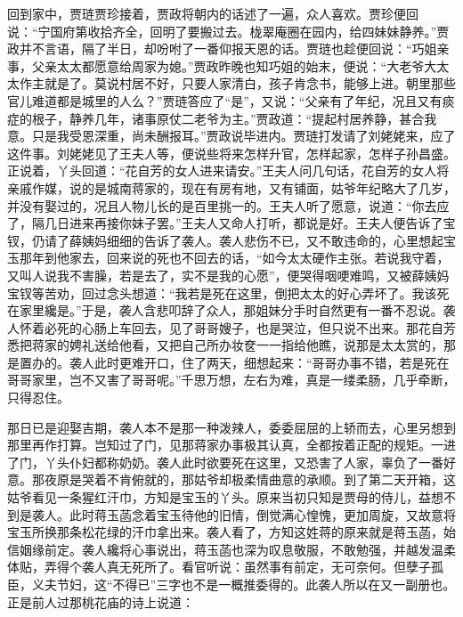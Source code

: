 \begin{parag}
    回到家中，贾琏贾珍接着，贾政将朝内的话述了一遍，众人喜欢。贾珍便回说：“宁国府第收拾齐全，回明了要搬过去。栊翠庵圈在园内，给四妹妹静养。”贾政并不言语，隔了半日，却吩咐了一番仰报天恩的话。贾琏也趁便回说：“巧姐亲事，父亲太太都愿意给周家为媳。”贾政昨晚也知巧姐的始末，便说：“大老爷大太太作主就是了。莫说村居不好，只要人家清白，孩子肯念书，能够上进。朝里那些官儿难道都是城里的人么？”贾琏答应了“是”，又说：“父亲有了年纪，况且又有痰症的根子，静养几年，诸事原仗二老爷为主。”贾政道：“提起村居养静，甚合我意。只是我受恩深重，尚未酬报耳。”贾政说毕进内。贾琏打发请了刘姥姥来，应了这件事。刘姥姥见了王夫人等，便说些将来怎样升官，怎样起家，怎样子孙昌盛。正说着，丫头回道：“花自芳的女人进来请安。”王夫人问几句话，花自芳的女人将亲戚作媒，说的是城南蒋家的，现在有房有地，又有铺面，姑爷年纪略大了几岁，并没有娶过的，况且人物儿长的是百里挑一的。王夫人听了愿意，说道：“你去应了，隔几日进来再接你妹子罢。”王夫人又命人打听，都说是好。王夫人便告诉了宝钗，仍请了薛姨妈细细的告诉了袭人。袭人悲伤不已，又不敢违命的，心里想起宝玉那年到他家去，回来说的死也不回去的话，“如今太太硬作主张。若说我守着，又叫人说我不害臊，若是去了，实不是我的心愿”，便哭得咽哽难鸣，又被薛姨妈宝钗等苦劝，回过念头想道：“我若是死在这里，倒把太太的好心弄坏了。我该死在家里纔是。”于是，袭人含悲叩辞了众人，那姐妹分手时自然更有一番不忍说。袭人怀着必死的心肠上车回去，见了哥哥嫂子，也是哭泣，但只说不出来。那花自芳悉把蒋家的娉礼送给他看，又把自己所办妆奁一一指给他瞧，说那是太太赏的，那是置办的。袭人此时更难开口，住了两天，细想起来：“哥哥办事不错，若是死在哥哥家里，岂不又害了哥哥呢。”千思万想，左右为难，真是一缕柔肠，几乎牵断，只得忍住。
\end{parag}


\begin{parag}
    那日已是迎娶吉期，袭人本不是那一种泼辣人，委委屈屈的上轿而去，心里另想到那里再作打算。岂知过了门，见那蒋家办事极其认真，全都按着正配的规矩。一进了门，丫头仆妇都称奶奶。袭人此时欲要死在这里，又恐害了人家，辜负了一番好意。那夜原是哭着不肯俯就的，那姑爷却极柔情曲意的承顺。到了第二天开箱，这姑爷看见一条猩红汗巾，方知是宝玉的丫头。原来当初只知是贾母的侍儿，益想不到是袭人。此时蒋玉菡念着宝玉待他的旧情，倒觉满心惶愧，更加周旋，又故意将宝玉所换那条松花绿的汗巾拿出来。袭人看了，方知这姓蒋的原来就是蒋玉菡，始信姻缘前定。袭人纔将心事说出，蒋玉菡也深为叹息敬服，不敢勉强，并越发温柔体贴，弄得个袭人真无死所了。看官听说：虽然事有前定，无可奈何。但孽子孤臣，义夫节妇，这“不得已”三字也不是一概推委得的。此袭人所以在又一副册也。正是前人过那桃花庙的诗上说道：
\end{parag}


